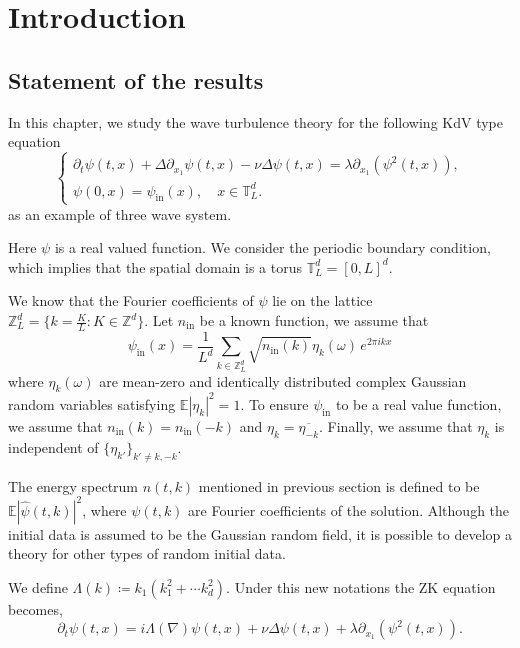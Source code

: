 \section{Introduction}

\subsection{Statement of the results}
In this chapter, we study the wave turbulence theory for the following KdV type equation
\begin{equation}\tag{MKDV}\label{eq.MKDV}
\begin{cases}
\partial_t\psi(t,x)+\Delta\partial_{x_1}\psi(t,x)-\nu \Delta \psi(t,x)=\lambda \partial_{x_1}(\psi^2(t,x)),\\[.6em]
\psi(0,x) = \psi_{\textrm{in}}(x), \quad x\in \mathbb{T}^d_{L}.
\end{cases}    
\end{equation}
as an example of three wave system.

Here $\psi$ is a real valued function. We consider the periodic boundary condition, which implies that the spatial domain is a torus $\mathbb{T}^d_{L}=[0,L]^d$. 

We know that the Fourier coefficients of $\psi$ lie on the lattice $\mathbb{Z}_L^d = \{k=\frac{K}{L}:K\in \mathbb{Z}^d\}$. Let $n_{\textrm{in}}$ be a known function, we assume that
\begin{equation}\label{eq.wellprepared}
\psi_{\textrm{in}}(x)=\frac{1}{L^d}\sum_{k\in\mathbb{Z}^d_L}\sqrt{n_{\textrm{in}}(k)} \eta_k(\omega)\,  e^{2\pi i kx}
\end{equation}
where $\eta_k(\omega)$ are mean-zero and identically distributed complex Gaussian random variables satisfying $\mathbb E |\eta_k|^2=1$. To ensure $\psi_{\textrm{in}}$ to be a real value function, we assume that $n_{\textrm{in}}(k)=n_{\textrm{in}}(-k)$ and $\eta_k=\overline{\eta_{-k}}$. Finally, we assume that $\eta_k$ is independent of $\{\eta_{k'}\}_{k'\ne k,-k}$.


The energy spectrum $n(t,k)$ mentioned in previous section is defined to be $\mathbb E |\widehat \psi(t, k)|^2$, where $\psi(t, k)$ are Fourier coefficients of the solution. Although the initial data is assumed to be the Gaussian random field, it is possible to develop a theory for other types of random initial data.


We define $\Lambda(k)\coloneqq k_{1}(k_1^2+\cdots k_d^2)$. Under this new notations the ZK equation becomes,
\[
\partial_t\psi(t,x)=i\Lambda(\nabla)\psi(t,x)+\nu \Delta \psi(t,x)+\lambda \partial_{x_1}(\psi^2(t,x)).
\]

